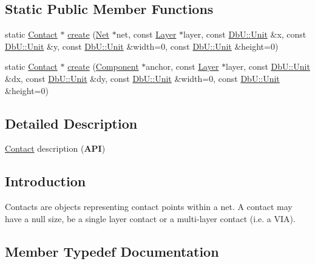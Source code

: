 \subsection*{Static Public Member Functions}
\begin{DoxyCompactItemize}
\item 
static \hyperlink{classHurricane_1_1Contact}{Contact} $\ast$ \hyperlink{classHurricane_1_1Contact_a5402fec0518c81d35fbec2c2b2ec0f8f}{create} (\hyperlink{classHurricane_1_1Net}{Net} $\ast$net, const \hyperlink{classHurricane_1_1Layer}{Layer} $\ast$layer, const \hyperlink{group__DbUGroup_ga4fbfa3e8c89347af76c9628ea06c4146}{Db\+U\+::\+Unit} \&x, const \hyperlink{group__DbUGroup_ga4fbfa3e8c89347af76c9628ea06c4146}{Db\+U\+::\+Unit} \&y, const \hyperlink{group__DbUGroup_ga4fbfa3e8c89347af76c9628ea06c4146}{Db\+U\+::\+Unit} \&width=0, const \hyperlink{group__DbUGroup_ga4fbfa3e8c89347af76c9628ea06c4146}{Db\+U\+::\+Unit} \&height=0)
\item 
static \hyperlink{classHurricane_1_1Contact}{Contact} $\ast$ \hyperlink{classHurricane_1_1Contact_a6645345f819cb4769fac075a0b1ea028}{create} (\hyperlink{classHurricane_1_1Component}{Component} $\ast$anchor, const \hyperlink{classHurricane_1_1Layer}{Layer} $\ast$layer, const \hyperlink{group__DbUGroup_ga4fbfa3e8c89347af76c9628ea06c4146}{Db\+U\+::\+Unit} \&dx, const \hyperlink{group__DbUGroup_ga4fbfa3e8c89347af76c9628ea06c4146}{Db\+U\+::\+Unit} \&dy, const \hyperlink{group__DbUGroup_ga4fbfa3e8c89347af76c9628ea06c4146}{Db\+U\+::\+Unit} \&width=0, const \hyperlink{group__DbUGroup_ga4fbfa3e8c89347af76c9628ea06c4146}{Db\+U\+::\+Unit} \&height=0)
\end{DoxyCompactItemize}


\subsection{Detailed Description}
\hyperlink{classHurricane_1_1Contact}{Contact} description ({\bfseries A\+PI}) 

\hypertarget{classHurricane_1_1Contact_secContactIntro}{}\subsection{Introduction}\label{classHurricane_1_1Contact_secContactIntro}
Contacts are objects representing contact points within a net. A contact may have a null size, be a single layer contact or a multi-\/layer contact (i.\+e. a V\+IA). 

\subsection{Member Typedef Documentation}
\mbox{\label{classHurricane_1_1Contact_a422f15bba0561d8499c001fb8cbe6b67}} 
